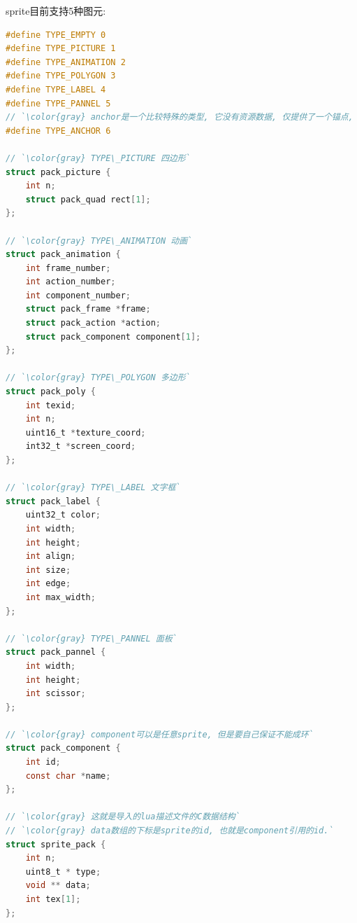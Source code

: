 {sprite目前支持5种图元:}\par
\begin{lstlisting}[language=C]
#define TYPE_EMPTY 0
#define TYPE_PICTURE 1
#define TYPE_ANIMATION 2
#define TYPE_POLYGON 3
#define TYPE_LABEL 4
#define TYPE_PANNEL 5
// `\color{gray} anchor是一个比较特殊的类型, 它没有资源数据, 仅提供了一个锚点, 可以挂载其他sprite`
#define TYPE_ANCHOR 6

// `\color{gray} TYPE\_PICTURE 四边形`
struct pack_picture {
    int n;
    struct pack_quad rect[1];
};

// `\color{gray} TYPE\_ANIMATION 动画`
struct pack_animation {
    int frame_number;
    int action_number;
    int component_number;
    struct pack_frame *frame;
    struct pack_action *action;
    struct pack_component component[1];
};

// `\color{gray} TYPE\_POLYGON 多边形`
struct pack_poly {
    int texid;
    int n;
    uint16_t *texture_coord;
    int32_t *screen_coord;
};

// `\color{gray} TYPE\_LABEL 文字框`
struct pack_label {
    uint32_t color;
    int width;
    int height;
    int align;
    int size;
    int edge;
    int max_width;
};

// `\color{gray} TYPE\_PANNEL 面板`
struct pack_pannel {
    int width;
    int height;
    int scissor;
};

// `\color{gray} component可以是任意sprite, 但是要自己保证不能成环`
struct pack_component {
    int id;
    const char *name;
};

// `\color{gray} 这就是导入的lua描述文件的C数据结构`
// `\color{gray} data数组的下标是sprite的id, 也就是component引用的id.`
struct sprite_pack {
    int n;
    uint8_t * type;
    void ** data;
    int tex[1];
};
\end{lstlisting}

